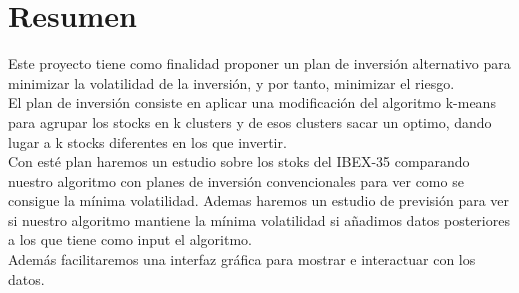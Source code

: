 \documentclass[12pt,a4paper]{article}
\begin{document}
	\section{Resumen}
	\vspace{1cm}
Este proyecto tiene como finalidad proponer un plan de inversión alternativo para minimizar la volatilidad de la inversión, y por tanto, minimizar el riesgo.\\
El plan de inversión consiste en aplicar una modificación del algoritmo k-means para agrupar los stocks en k clusters y de esos clusters sacar un optimo, dando lugar a k stocks diferentes en los que invertir.\\
Con esté plan haremos un estudio sobre los stoks del IBEX-35 comparando nuestro algoritmo con planes de inversión convencionales para ver como se consigue la mínima volatilidad. Ademas haremos un estudio de previsión para ver si nuestro algoritmo mantiene la mínima volatilidad si añadimos datos posteriores a los que tiene como input el algoritmo.\\
Además facilitaremos una interfaz gráfica para mostrar e interactuar con los datos.\\
\pagebreak
	\vspace{1cm}
\end{document}
